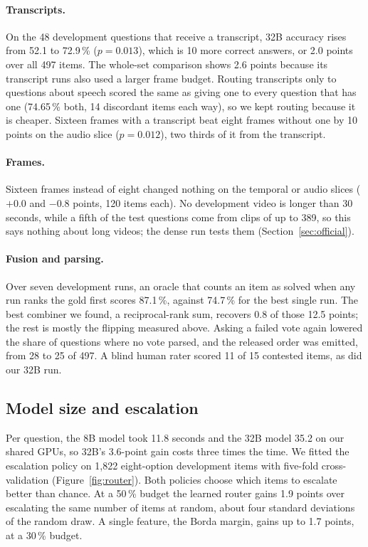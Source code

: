 \documentclass[sigconf,nonacm]{acmart}
\begin{document}
\paragraph{Transcripts.}
On the 48 development questions that receive a transcript, 32B accuracy rises
from 52.1 to 72.9\,\% ($p=0.013$), which is 10 more correct answers, or 2.0 points over all 497
items. The whole-set comparison shows 2.6 points because its transcript runs
also used a larger frame budget. Routing transcripts only to questions about speech scored the same as
giving one to every question that has one (74.65\,\% both, 14 discordant items
each way), so we kept routing because it is cheaper. Sixteen frames with a
transcript beat eight frames without one by 10 points on the audio slice
($p=0.012$), two thirds of it from the transcript.

\paragraph{Frames.}
Sixteen frames instead of eight changed nothing on the temporal or audio slices
($+0.0$ and $-0.8$ points, 120 items each). No development video is longer than
30 seconds, while a fifth of the test questions come from clips of up to 389, so
this says nothing about long videos; the dense run tests them
(Section~\ref{sec:official}).

\paragraph{Fusion and parsing.}
Over seven development runs, an oracle that counts an item as solved when any run
ranks the gold first scores 87.1\,\%, against 74.7\,\% for the best single run.
The best combiner we found, a reciprocal-rank sum, recovers 0.8 of those 12.5
points; the rest is mostly the flipping measured above. Asking a failed vote
again lowered the share of questions where no vote parsed, and the released order
was emitted, from 28 to 25 of 497. A blind human rater scored 11 of 15 contested
items, as did our 32B run.

\subsection{Model size and escalation}
\label{sec:cascaderes}

Per question, the 8B model took 11.8 seconds and the 32B model 35.2 on our shared
GPUs, so 32B's 3.6-point gain costs three times the time. We fitted the
escalation policy on 1,822 eight-option development items with five-fold
cross-validation (Figure~\ref{fig:router}). Both policies choose which items to
escalate better than chance. At a 50\,\% budget the learned router gains 1.9
points over escalating the same number of items at random, about four standard
deviations of the random draw. A single feature, the Borda margin, gains up to
1.7 points, at a 30\,\% budget.
\end{document}

